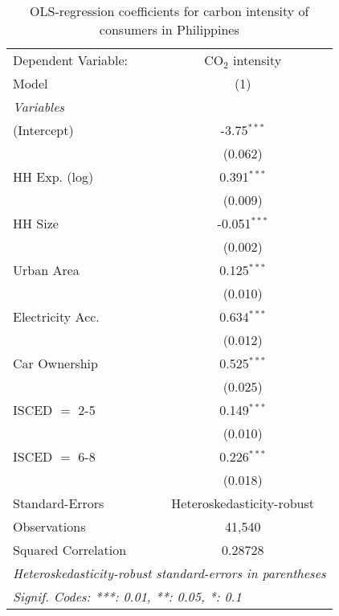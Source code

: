 
\begin{table}[htbp!]
   \centering
   \small
   \begin{adjustbox}{width = 1\textwidth, max height = 0.95\textheight, center}
      \begin{threeparttable}[b]
         \caption{\label{tab:OLS_1_PHL} OLS-regression coefficients for carbon intensity of consumers in Philippines}
         \begin{tabular}{lc}
            \tabularnewline \midrule \midrule
            Dependent Variable: & CO$_{2}$ intensity\\  
            Model               & (1)\\  
            \midrule
            \emph{Variables}\\
            (Intercept)         & -3.75$^{***}$\\   
                                & (0.062)\\   
            HH Exp. (log)       & 0.391$^{***}$\\   
                                & (0.009)\\   
            HH Size             & -0.051$^{***}$\\   
                                & (0.002)\\   
            Urban Area          & 0.125$^{***}$\\   
                                & (0.010)\\   
            Electricity Acc.    & 0.634$^{***}$\\   
                                & (0.012)\\   
            Car Ownership       & 0.525$^{***}$\\   
                                & (0.025)\\   
            ISCED $=$ 2-5       & 0.149$^{***}$\\   
                                & (0.010)\\   
            ISCED $=$ 6-8       & 0.226$^{***}$\\   
                                & (0.018)\\   
            \midrule 
            Standard-Errors     & Heteroskedasticity-robust \\   
            Observations        & 41,540\\  
            Squared Correlation & 0.28728\\  
            \midrule \midrule
            \multicolumn{2}{l}{\emph{Heteroskedasticity-robust standard-errors in parentheses}}\\
            \multicolumn{2}{l}{\emph{Signif. Codes: ***: 0.01, **: 0.05, *: 0.1}}\\
         \end{tabular}
         

\end{threeparttable}
\end{adjustbox}
\end{table}
